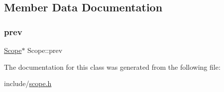 \subsection{Member Data Documentation}
\mbox{\label{classScope_abc7b9357aa6fae81075bca080ea73d5f}} 
\subsubsection{\texorpdfstring{prev}{prev}}
{\footnotesize\ttfamily \hyperlink{classScope}{Scope}$\ast$ Scope\+::prev}



The documentation for this class was generated from the following file\+:\begin{DoxyCompactItemize}
\item 
include/\hyperlink{scope_8h}{scope.\+h}\end{DoxyCompactItemize}
